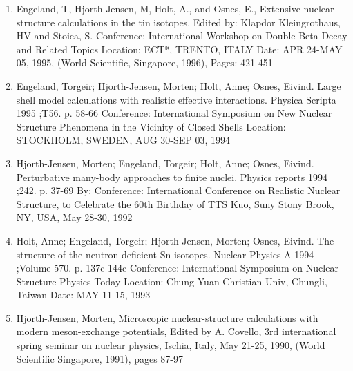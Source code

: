 \documentclass[%
oneside,                 %
final,                   %
10pt]{article}
\begin{document}
\begin{enumerate}
\item Engeland, T, Hjorth-Jensen, M, Holt, A., and Osnes, E.,  Extensive nuclear structure calculations in the tin isotopes. Edited by: Klapdor Kleingrothaus, HV and Stoica, S. Conference: International Workshop on Double-Beta Decay and Related Topics Location: ECT*, TRENTO, ITALY Date: APR 24-MAY 05, 1995, (World Scientific, Singapore, 1996), Pages: 421-451

\item Engeland, Torgeir; Hjorth-Jensen, Morten; Holt, Anne; Osnes, Eivind.  Large shell model calculations with realistic effective interactions. Physica Scripta 1995 ;T56. p. 58-66 Conference: International Symposium on New Nuclear Structure Phenomena in the Vicinity of Closed Shells Location: STOCKHOLM, SWEDEN, AUG 30-SEP 03, 1994 

\item Hjorth-Jensen, Morten; Engeland, Torgeir; Holt, Anne; Osnes, Eivind.  Perturbative many-body approaches to finite nuclei. Physics reports 1994 ;242. p. 37-69 By: Conference: International Conference on Realistic Nuclear Structure, to Celebrate the 60th Birthday of TTS Kuo, Suny Stony Brook, NY, USA,  May 28-30, 1992

\item Holt, Anne; Engeland, Torgeir; Hjorth-Jensen, Morten; Osnes, Eivind.  The structure of the neutron deficient Sn isotopes. Nuclear Physics A 1994 ;Volume 570. p. 137c-144c Conference: International Symposium on Nuclear Structure Physics Today Location: Chung Yuan Christian Univ, Chungli, Taiwan Date: MAY 11-15, 1993 

\item Hjorth-Jensen, Morten,  Microscopic nuclear-structure calculations with modern meson-exchange potentials, Edited by A. Covello, 3rd international spring seminar on nuclear physics, Ischia, Italy, May 21-25, 1990, (World Scientific Singapore, 1991), pages 87-97 
\end{enumerate}

\noindent
\end{document}
